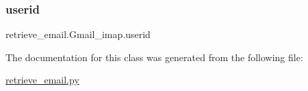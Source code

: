 \mbox{\label{classretrieve__email_1_1Gmail__imap_a241e396e8bbcedd36d899dce1d7b4528}} 
\subsubsection{\texorpdfstring{userid}{userid}}
{\footnotesize\ttfamily retrieve\+\_\+email.\+Gmail\+\_\+imap.\+userid}



The documentation for this class was generated from the following file\+:\begin{DoxyCompactItemize}
\item 
\hyperlink{retrieve__email_8py}{retrieve\+\_\+email.\+py}\end{DoxyCompactItemize}
